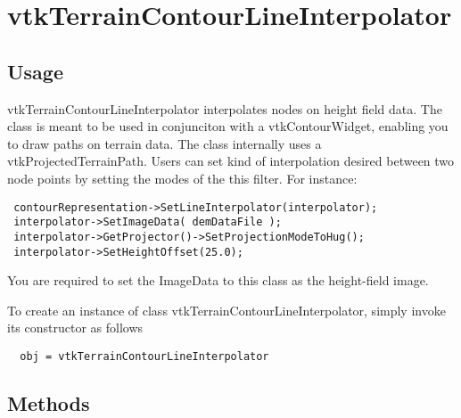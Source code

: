 \section{vtkTerrainContourLineInterpolator}

\subsection{Usage}

 vtkTerrainContourLineInterpolator interpolates nodes on height field data.
 The class is meant to be used in conjunciton with a vtkContourWidget, 
 enabling you to draw paths on terrain data. The class internally uses a 
 vtkProjectedTerrainPath. Users can set kind of interpolation
 desired between two node points by setting the modes of the this filter.
 For instance:

 \begin{verbatim}
 contourRepresentation->SetLineInterpolator(interpolator);
 interpolator->SetImageData( demDataFile );
 interpolator->GetProjector()->SetProjectionModeToHug();
 interpolator->SetHeightOffset(25.0);
 \end{verbatim}

 You are required to set the ImageData to this class as the height-field 
 image.


To create an instance of class vtkTerrainContourLineInterpolator, simply
invoke its constructor as follows
\begin{verbatim}
  obj = vtkTerrainContourLineInterpolator
\end{verbatim}
\subsection{Methods}

